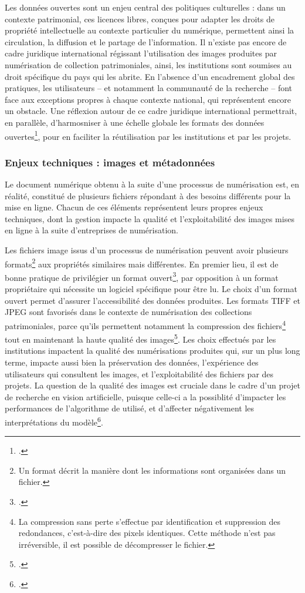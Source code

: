 Les données ouvertes sont un enjeu central des politiques culturelles : dans un contexte patrimonial, ces licences libres, conçues pour adapter les droits de propriété intellectuelle au contexte particulier du numérique, permettent ainsi la circulation, la diffusion et le partage de l'information. Il n'existe pas encore de cadre juridique international régissant l'utilisation des images produites par numérisation de collection patrimoniales, ainsi, les institutions sont soumises au droit spécifique du pays qui les abrite. En l'absence d'un encadrement global des pratiques, les utilisateurs -- et notamment la communauté de la recherche -- font face aux exceptions propres à chaque contexte national, qui représentent encore un obstacle. Une réflexion autour de ce cadre juridique international permettrait, en parallèle, d'harmosniser à une échelle globale les formats des données ouvertes\footcite{benhamouDroitAuteurMusees2016}, pour en faciliter la réutilisation par les institutions et par les projets.

        \subsubsection{Enjeux techniques : images et métadonnées}
Le document numérique obtenu à la suite d'une processus de numérisation est, en réalité, constitué de plusieurs fichiers répondant à des besoins différents pour la mise en ligne. Chacun de ces éléments représentent leurs propres enjeux techniques, dont la gestion impacte la qualité et l'exploitabilité des images mises en ligne à la suite d'entreprises de numérisation.

Les fichiers image issus d'un processus de numérisation peuvent avoir plusieurs formats\footnote{Un format décrit la manière dont les informations sont organisées dans un fichier.} aux propriétés similaires mais différentes. En premier lieu, il est de bonne pratique de privilégier un format ouvert\footcite{besseNumerisationMasseVers2019}, par opposition à un format propriétaire qui nécessite un logiciel spécifique pour être lu. Le choix d'un format ouvert permet d'assurer l'accessibilité des données produites. Les formats TIFF et JPEG sont favorisés dans le contexte de numérisation des collections patrimoniales, parce qu'ils permettent notamment la compression des fichiers\footnote{La compression sans perte s'effectue par identification et suppression des redondances, c'est-à-dire des pixels identiques. Cette méthode n'est pas irréversible, il est possible de décompresser le fichier.} tout en maintenant la haute qualité des images\footcite{DigitalImages2020}. Les choix effectués par les institutions impactent la qualité des numérisations produites qui, sur un plus long terme, impacte aussi bien la préservation des données, l'expérience des utilisateurs qui consultent les images, et l'exploitabilité des fichiers par des projets. La question de la qualité des images est cruciale dans le cadre d'un projet de recherche en vision artificielle, puisque celle-ci a la possiblité d'impacter les performances de l'algorithme de utilisé, et d'affecter négativement les interprétations du modèle\footcite{bergstromImageQualityComputer2023}.

